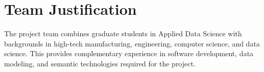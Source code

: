 \documentclass[sigconf]{acmart}
\begin{document}
\section{Team Justification}
The project team combines graduate students in Applied Data Science with backgrounds in high-tech manufacturing, engineering, computer science, and data science. This provides complementary experience in software development, data modeling, and semantic technologies required for the project.



\end{document}
